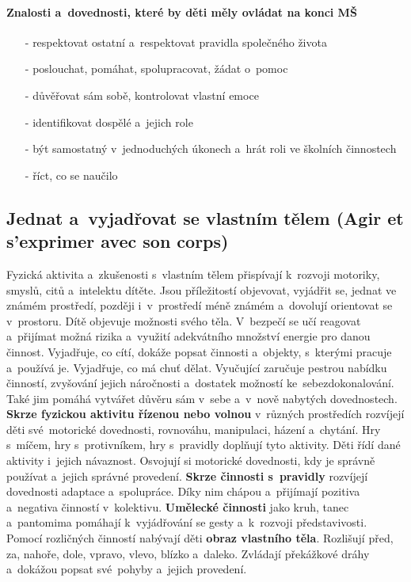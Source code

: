 			\paragraph{Znalosti a~dovednosti, které by děti měly ovládat na konci MŠ}
			\begin{itemize}
				\setlength\itemsep{-2mm}
				\item[-] respektovat ostatní a~respektovat pravidla společného života
				\item[-] poslouchat, pomáhat, spolupracovat, žádat o~pomoc
				\item[-] důvěřovat sám sobě, kontrolovat vlastní emoce
				\item[-] identifikovat dospělé a~jejich role
				\item[-] být samostatný v jednoduchých úkonech a~hrát roli ve školních činnostech
				\item[-] říct, co se naučilo
				\end{itemize}

		\subsection{Jednat a~vyjadřovat se vlastním tělem (Agir et s'exprimer avec son corps)}

			Fyzická aktivita a~zkušenosti s vlastním tělem přispívají k rozvoji motoriky, smyslů, citů a intelektu dítěte. Jsou příležitostí objevovat, vyjádřit se, jednat ve známém prostředí, později i~v~prostředí méně známém a~dovolují orientovat se v prostoru. Dítě objevuje možnosti svého těla. V bezpečí se učí reagovat a~přijímat možná rizika a~využití adekvátního množství energie pro danou činnost. Vyjadřuje, co cítí, dokáže popsat činnosti a~objekty, s kterými pracuje a~používá je. Vyjadřuje, co má chuť dělat. Vyučující zaručuje  pestrou nabídku činností, zvyšování jejich náročnosti a~dostatek možností ke sebezdokonalování. Také jim pomáhá vytvářet důvěru sám v sebe a~v nově nabytých dovednostech. 
			\textbf{Skrze fyzickou aktivitu řízenou nebo volnou} v různých prostředích rozvíjejí děti své motorické dovednosti, rovnováhu, manipulaci, házení a~chytání. Hry s míčem, hry s protivníkem, hry s pravidly doplňují tyto aktivity. Děti řídí dané aktivity i~jejich návaznost. Osvojují si motorické dovednosti, kdy je správně používat a~jejich správné provedení. 
			\textbf{Skrze činnosti s pravidly} rozvíjejí dovednosti adaptace a~spolupráce. Díky nim chápou a přijímají pozitiva a~negativa činností v kolektivu. 
			\textbf{Umělecké činnosti} jako kruh, tanec a~pantomima pomáhají k vyjádřování se gesty a~k~rozvoji představivosti.
			Pomocí rozličných činností nabývají děti \textbf{obraz vlastního těla}. Rozlišují před, za, nahoře, dole, vpravo, vlevo, blízko a~daleko. Zvládají překážkové dráhy a~dokážou popsat své pohyby a~jejich provedení.
